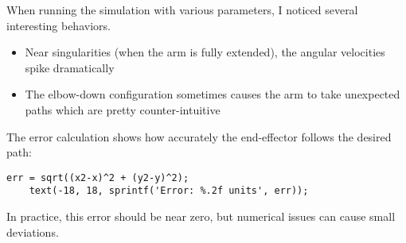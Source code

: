 \documentclass{article}
\begin{document}
When running the simulation with various parameters, I noticed several interesting behaviors.

\begin{itemize}
    \item Near singularities (when the arm is fully extended), the angular velocities spike dramatically
    \item The elbow-down configuration sometimes causes the arm to take unexpected paths which are pretty counter-intuitive
\end{itemize}

The error calculation shows how accurately the end-effector follows the desired path:

\begin{lstlisting}[style=Matlab-editor]
    err = sqrt((x2-x)^2 + (y2-y)^2);
    text(-18, 18, sprintf('Error: %.2f units', err));
\end{lstlisting}

In practice, this error should be near zero, but numerical issues can cause small deviations.
\end{document}
